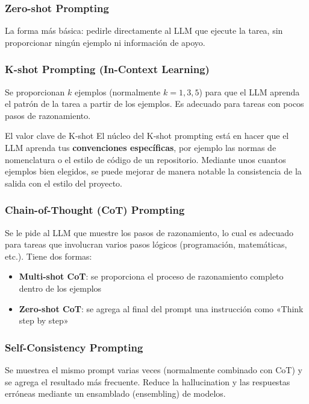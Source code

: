\documentclass[a4paper]{article}
\begin{document}
\subsubsection{Zero-shot Prompting}

La forma más básica: pedirle directamente al LLM que ejecute la tarea, sin proporcionar ningún ejemplo ni información de apoyo.

\subsubsection{K-shot Prompting (In-Context Learning)}

Se proporcionan $k$ ejemplos (normalmente $k = 1, 3, 5$) para que el LLM aprenda el patrón de la tarea a partir de los ejemplos. Es adecuado para tareas con pocos pasos de razonamiento.

\begin{importantbox}{El valor clave de K-shot}
El núcleo del K-shot prompting está en hacer que el LLM aprenda tus \textbf{convenciones específicas}, por ejemplo las normas de nomenclatura o el estilo de código de un repositorio. Mediante unos cuantos ejemplos bien elegidos, se puede mejorar de manera notable la consistencia de la salida con el estilo del proyecto.
\end{importantbox}

\subsubsection{Chain-of-Thought (CoT) Prompting}

Se le pide al LLM que muestre los pasos de razonamiento, lo cual es adecuado para tareas que involucran varios pasos lógicos (programación, matemáticas, etc.). Tiene dos formas:
\begin{itemize}
    \item \textbf{Multi-shot CoT}: se proporciona el proceso de razonamiento completo dentro de los ejemplos
    \item \textbf{Zero-shot CoT}: se agrega al final del prompt una instrucción como «Think step by step»
\end{itemize}

\subsubsection{Self-Consistency Prompting}

Se muestrea el mismo prompt varias veces (normalmente combinado con CoT) y se agrega el resultado más frecuente. Reduce la hallucination y las respuestas erróneas mediante un ensamblado (ensembling) de modelos.
\end{document}
